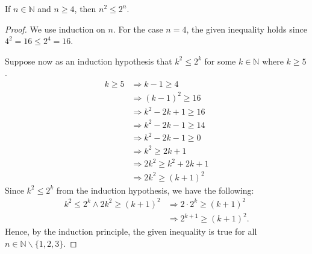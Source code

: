 \documentclass[../main.tex]{subfiles}
\begin{document}
\begin{prop} \label{prop:sq_pow}
    If $n \in \mathbb N$ and $n \geq 4$, then $n^2 \leq 2^n$.
\end{prop}
\begin{proof}
    We use induction on $n$.
    For the case $n = 4$, the given inequality holds since $4^2 = 16 \leq 2^4 = 16$.

    Suppose now as an induction hypothesis that $k^2 \leq 2^k$ for some $k \in \mathbb N$ where $k \geq 5$.
    \begin{align*}
        k \geq 5 &\Rightarrow k - 1 \geq 4\\
                 &\Rightarrow (k - 1)^2 \geq 16\\
                 &\Rightarrow k^2 - 2k + 1 \geq 16\\
                 &\Rightarrow k^2 - 2k - 1 \geq 14\\
                 &\Rightarrow k^2 - 2k - 1 \geq 0\\
                 &\Rightarrow k^2 \geq 2k + 1\\
                 &\Rightarrow 2k^2 \geq k^2 + 2k + 1\\
                 &\Rightarrow 2k^2 \geq (k + 1)^2
    \end{align*}
    Since $k^2 \leq 2^k$ from the induction hypothesis, we have the following:
    \begin{align*}
        k^2 \leq 2^k \wedge 2k^2 \geq (k + 1)^2 &\Rightarrow 2 \cdot 2^k \geq (k + 1)^2\\
                                                &\Rightarrow 2^{k + 1} \geq (k + 1)^2.
    \end{align*}
    Hence, by the induction principle, the given inequality is true for all $n \in \mathbb N\backslash \{1, 2, 3\}$.
\end{proof}
\end{document}
